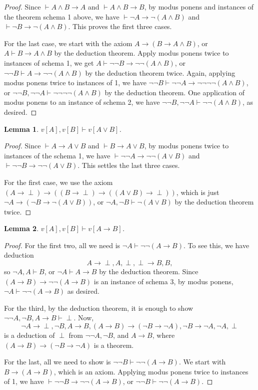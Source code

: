 \documentclass[12pt]{article}
\newtheorem{lem}{Lemma}
\begin{document}
\begin{proof}  Since $\vdash A\land B \to A$ and $\vdash A\land B\to B$, by modus ponens and instances of the theorem schema 1 above, we have $\vdash \neg A \to \neg (A\land B)$ and $\vdash \neg B \to \neg (A\land B)$.  This proves the first three cases.

For the last case, we start with the axiom $A\to (B\to A\land B)$, or $A \vdash B\to A\land B$ by the deduction theorem.  Apply modus ponens twice to instances of schema 1, we get $A \vdash \neg \neg B \to \neg \neg(A\land B)$, or $\neg \neg B \vdash A \to \neg \neg (A\land B)$ by the deduction theorem twice.  Again, applying modus ponens twice to instances of 1, we have $\neg \neg B\vdash \neg \neg A \to \neg \neg \neg \neg (A\land B)$, or $\neg \neg B, \neg \neg A \vdash \neg \neg \neg \neg (A\land B)$ by the deduction theorem.  One application of modus ponens to an instance of schema 2, we have $\neg \neg B, \neg \neg A \vdash \neg \neg (A\land B)$, as desired.
\end{proof}

\begin{lem}  
$v[A],v[B]\vdash v[A\lor B]$.
\end{lem}
\begin{proof}  Since $\vdash A \to A\lor B$ and $\vdash B\to A\lor B$, by modus ponens twice to instances of the schema 1, we have $\vdash \neg \neg A \to \neg \neg (A\lor B)$ and $\vdash \neg \neg B \to \neg \neg (A\lor B)$.  This settles the last three cases.

For the first case, we use the axiom $(A\to \perp)\to ((B\to \perp) \to ((A\lor B)\to \perp))$, which is just $\neg A \to (\neg B\to \neg (A\lor B))$, or $\neg A,\neg B\vdash \neg (A\lor B)$ by the deduction theorem twice.
\end{proof}

\begin{lem}  
$v[A],v[B]\vdash v[A\to B]$.
\end{lem}
\begin{proof}  
For the first two, all we need is $\neg A \vdash \neg \neg (A\to B)$.  To see this, we have deduction $$A \to \perp, A, \perp, \perp \to B, B,$$ so $\neg A, A\vdash B$, or $\neg A \vdash A\to B$ by the deduction theorem.  Since $(A\to B) \to \neg \neg (A\to B)$ is an instance of schema 3, by modus ponens, $\neg A \vdash \neg \neg (A\to B)$ as desired.

For the third, by the deduction theorem, it is enough to show $\neg \neg A, \neg B, A\to B \vdash \perp$.  Now,
$$\neg A \to \perp, \neg B, A \to B, (A\to B)\to (\neg B\to \neg A), \neg B \to \neg A, \neg A, \perp$$ is a deduction of $\perp$ from $\neg \neg A, \neg B$, and $A\to B$, where $(A\to B) \to (\neg B\to \neg A)$ is a theorem.

For the last, all we need to show is $\neg \neg B\vdash \neg \neg (A\to B)$.  We start with $B\to (A\to B)$, which is an axiom. Applying modus ponens twice to instances of 1, we have $\vdash \neg \neg B \to \neg \neg (A\to B)$, or $\neg \neg B \vdash \neg \neg (A\to B)$.
\end{proof}
\end{document}
